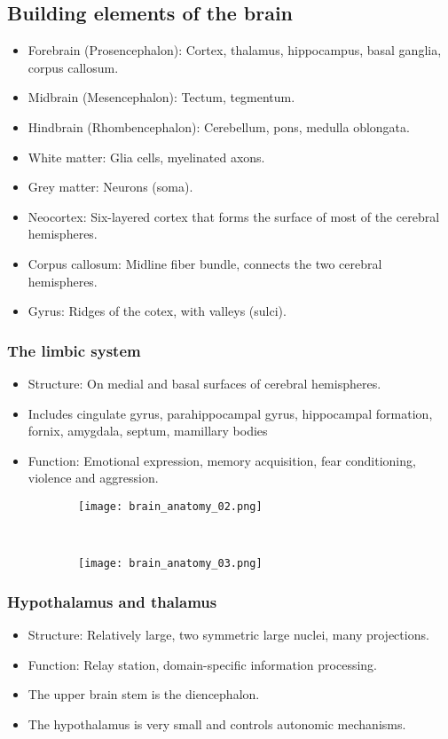 \documentclass[main]{subfiles}
\begin{document}
\subsection{Building elements of the brain}
\begin{itemize}[noitemsep,nolistsep]
	\item Forebrain (Prosencephalon): Cortex, thalamus, hippocampus, basal ganglia, corpus callosum.
	\item Midbrain (Mesencephalon): Tectum, tegmentum.
	\item Hindbrain (Rhombencephalon): Cerebellum, pons, medulla oblongata.
	\item White matter: Glia cells, myelinated axons.
	\item Grey matter: Neurons (soma).
	\item Neocortex: Six-layered cortex that forms the surface of most of the cerebral hemispheres.
	\item Corpus callosum: Midline fiber bundle, connects the two cerebral hemispheres.
	\item Gyrus: Ridges of the cotex, with valleys (sulci).
\end{itemize}
\subsubsection{The limbic system}
\begin{itemize}[noitemsep,nolistsep]
	\item Structure: On medial and basal surfaces of cerebral hemispheres.
	\item Includes cingulate gyrus, parahippocampal gyrus, hippocampal formation, fornix, amygdala, septum, mamillary bodies
	\item Function: Emotional expression, memory acquisition, fear conditioning, violence and aggression.
\end{itemize}
\begin{figure}[H]
	\centering
	\begin{subfigure}[b]{0.5\textwidth}
		\centering
		\texttt{[image: brain\_anatomy\_02.png]}
	\end{subfigure}%
	~
	\begin{subfigure}[b]{0.5\textwidth}
		\centering
		\texttt{[image: brain\_anatomy\_03.png]}
	\end{subfigure}
\end{figure}
\subsubsection{Hypothalamus and thalamus}
\begin{itemize}[noitemsep,nolistsep]
	\item Structure: Relatively large, two symmetric large nuclei, many projections.
	\item Function: Relay station, domain-specific information processing.
	\item The upper brain stem is the diencephalon.
	\item The hypothalamus is very small and controls autonomic mechanisms.
\end{itemize}
\end{document}
